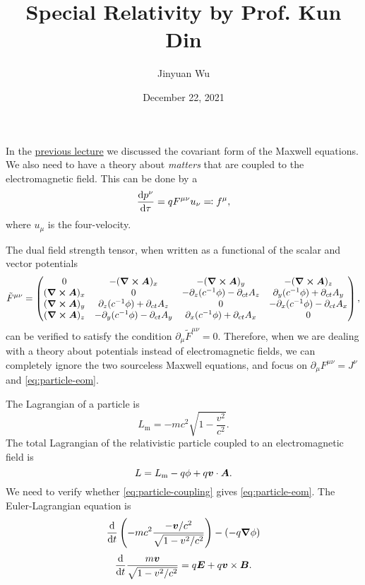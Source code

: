 \documentclass[hyperref, a4paper]{article}
\title{Special Relativity by Prof. Kun Din}
\author{Jinyuan Wu}
\date{December 22, 2021}
\begin{document}
\maketitle

In the \href{lecture-12-15.pdf}{previous lecture} we discussed the covariant form of the Maxwell equations.
We also need to have a theory about \emph{matters} that are coupled to the electromagnetic field.
This can be done by a 
\begin{equation}
    \dv{p^\nu}{\tau} = q F^{\mu \nu} u_\nu \eqqcolon f^\mu,
    \label{eq:particle-eom}
\end{equation}
where $u_\mu$ is the four-velocity. 

The dual field strength tensor, when written as a functional of the scalar and vector potentials
\begin{equation}
    \tilde{F}^{\mu \nu} = \pmqty{ 0 & - (\curl{\vb*{A}})_x & - (\curl{\vb*{A}})_y  & - (\curl{\vb*{A}})_z \\
    (\curl{\vb*{A}})_x & 0 & - \partial_z (c^{-1} \phi) - \partial_{ct} A_z & \partial_y (c^{-1} \phi) + \partial_{ct} A_y \\ 
    (\curl{\vb*{A}})_y & \partial_z(c^{-1} \phi) + \partial_{ct} A_z & 0 & - \partial_x(c^{-1} \phi) - \partial_{ct} A_x \\
    (\curl{\vb*{A}})_z & - \partial_y(c^{-1} \phi) - \partial_{ct} A_y & \partial_x(c^{-1} \phi) + \partial_{ct} A_x & 0 },
\end{equation}
can be verified to satisfy the condition $\partial_\mu \tilde{F}^{\mu \nu} = 0$. Therefore, when we are dealing  
with a theory about potentials instead of electromagnetic fields, we can completely ignore the two sourceless 
Maxwell equations, and focus on $\partial_\mu F^{\mu \nu} = J^\nu$ and \eqref{eq:particle-eom}.

The Lagrangian of a particle is 
\begin{equation}
    L_\text{m} = - m c^2 \sqrt{1 - \frac{v^2}{c^2}}.
\end{equation}
The total Lagrangian of the relativistic particle coupled to an electromagnetic field is 
\begin{equation}
    L = L_\text{m} - q \phi + q \vb*{v} \cdot \vb*{A}.
    \label{eq:particle-coupling}
\end{equation}
We need to verify whether \eqref{eq:particle-coupling} gives \eqref{eq:particle-eom}. The Euler-Lagrangian 
equation is 
\[
    \dv{t} \left( - m c^2 \frac{- \vb*{v} / c^2}{\sqrt{1 - v^2 / c^2}} \right)  - (- q \grad{\phi} )
\]
\begin{equation}
    \dv{t} \frac{m \vb*{v}}{\sqrt{1 - v^2 / c^2}} = q \vb*{E} + q \vb*{v} \times \vb*{B}.
\end{equation}
\end{document}
